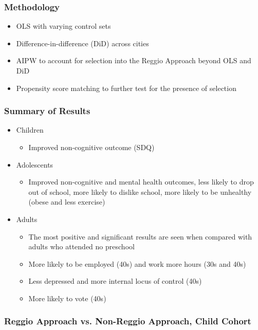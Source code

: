 \documentclass[dynamic]{JJH-Beamer}
\begin{document}
\begin{frame}
\frametitle{Methodology}
\begin{itemize}
	\item OLS with varying control sets 
	\item Difference-in-difference (DiD) across cities 
	\item AIPW to account for selection into the Reggio Approach beyond OLS and DiD
	\item Propensity score matching to further test for the presence of selection 
\end{itemize}
\end{frame}


\begin{frame}
\frametitle{Summary of Results}
\begin{itemize}
	\item Children
	\begin{itemize}
		\item Improved non-cognitive outcome (SDQ)
	\end{itemize}
	\item Adolescents
	\begin{itemize}
		\item Improved non-cognitive and mental health outcomes, less likely to drop out of school, more likely to dislike school, more likely to be unhealthy (obese and less exercise)
	\end{itemize}
	\item Adults
		\begin{itemize}
		\item The most positive and significant results are seen when compared with adults who attended no preschool
		\item More likely to be employed (40s) and work more hours (30s and 40s)
		\item Less depressed and more internal locus of control (40s)
		\item More likely to vote (40s)
		\end{itemize}
\end{itemize}
\end{frame}


\begin{frame}
\frametitle{Reggio Approach vs. Non-Reggio Approach, Child Cohort}
\centering
{}
\end{frame}
\end{document}
